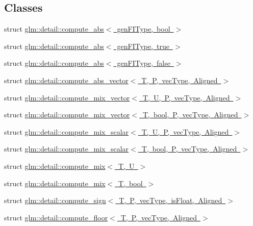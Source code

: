 \subsection*{Classes}
\begin{DoxyCompactItemize}
\item 
struct \mbox{\hyperlink{structglm_1_1detail_1_1compute__abs}{glm\+::detail\+::compute\+\_\+abs$<$ gen\+F\+I\+Type, bool $>$}}
\item 
struct \mbox{\hyperlink{structglm_1_1detail_1_1compute__abs_3_01gen_f_i_type_00_01true_01_4}{glm\+::detail\+::compute\+\_\+abs$<$ gen\+F\+I\+Type, true $>$}}
\item 
struct \mbox{\hyperlink{structglm_1_1detail_1_1compute__abs_3_01gen_f_i_type_00_01false_01_4}{glm\+::detail\+::compute\+\_\+abs$<$ gen\+F\+I\+Type, false $>$}}
\item 
struct \mbox{\hyperlink{structglm_1_1detail_1_1compute__abs__vector}{glm\+::detail\+::compute\+\_\+abs\+\_\+vector$<$ T, P, vec\+Type, Aligned $>$}}
\item 
struct \mbox{\hyperlink{structglm_1_1detail_1_1compute__mix__vector}{glm\+::detail\+::compute\+\_\+mix\+\_\+vector$<$ T, U, P, vec\+Type, Aligned $>$}}
\item 
struct \mbox{\hyperlink{structglm_1_1detail_1_1compute__mix__vector_3_01_t_00_01bool_00_01_p_00_01vec_type_00_01_aligned_01_4}{glm\+::detail\+::compute\+\_\+mix\+\_\+vector$<$ T, bool, P, vec\+Type, Aligned $>$}}
\item 
struct \mbox{\hyperlink{structglm_1_1detail_1_1compute__mix__scalar}{glm\+::detail\+::compute\+\_\+mix\+\_\+scalar$<$ T, U, P, vec\+Type, Aligned $>$}}
\item 
struct \mbox{\hyperlink{structglm_1_1detail_1_1compute__mix__scalar_3_01_t_00_01bool_00_01_p_00_01vec_type_00_01_aligned_01_4}{glm\+::detail\+::compute\+\_\+mix\+\_\+scalar$<$ T, bool, P, vec\+Type, Aligned $>$}}
\item 
struct \mbox{\hyperlink{structglm_1_1detail_1_1compute__mix}{glm\+::detail\+::compute\+\_\+mix$<$ T, U $>$}}
\item 
struct \mbox{\hyperlink{structglm_1_1detail_1_1compute__mix_3_01_t_00_01bool_01_4}{glm\+::detail\+::compute\+\_\+mix$<$ T, bool $>$}}
\item 
struct \mbox{\hyperlink{structglm_1_1detail_1_1compute__sign}{glm\+::detail\+::compute\+\_\+sign$<$ T, P, vec\+Type, is\+Float, Aligned $>$}}
\item 
struct \mbox{\hyperlink{structglm_1_1detail_1_1compute__floor}{glm\+::detail\+::compute\+\_\+floor$<$ T, P, vec\+Type, Aligned $>$}}

\end{DoxyCompactItemize}
